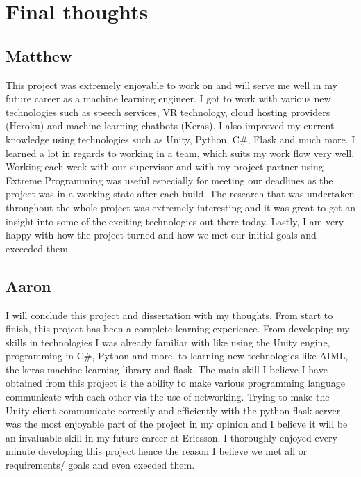\section{Final thoughts}
\subsection{Matthew}
This project was extremely enjoyable to work on and will serve me well in my future career as a machine learning engineer. I got to work with various new technologies such as speech services, VR technology, cloud hosting providers (Heroku) and machine learning chatbots (Keras). I also improved my current knowledge using technologies such as Unity, Python, C\#, Flask and much more. I learned a lot in regards to working in a team, which suits my work flow very well. Working each week with our supervisor and with my project partner using Extreme Programming was useful especially for meeting our deadlines as the project was in a working state after each build. The research that was undertaken throughout the whole project was extremely interesting and it was great to get an insight into some of the exciting technologies out there today. Lastly, I am very happy with how the project turned and how we met our initial goals and exceeded them.

\subsection{Aaron}
I will conclude this project and dissertation with my thoughts. From start to finish, this project has been a complete learning experience. From developing my skills in technologies I was already familiar with like using the Unity engine, programming in C\#, Python and more, to learning new technologies like AIML, the keras machine learning library and flask. The main skill I believe I have obtained from this project is the ability to make various programming language communicate with each other via the use of networking. Trying to make the Unity client communicate correctly and efficiently with the python flask server was the most enjoyable part of the project in my opinion and I believe it will be an invaluable skill in my future career at Ericsson. I thoroughly enjoyed every minute developing this project hence the reason I believe we met all or requirements/ goals and even exeeded them.